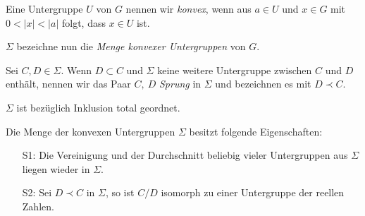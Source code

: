 \begin{defn}\label{konvexUGR} %
Eine Untergruppe $U$ von $G$ nennen wir \textit{konvex}, wenn aus $a \in U$ und $x \in G$ mit $0 < |x| < |a|$ folgt, dass $x \in U$ ist.\\
\end{defn}
$\Sigma$ bezeichne nun die \textit{Menge konvexer Untergruppen} von $G$. 
\begin{defn}\label{Sprung} %
Sei $C, D \in \Sigma$. Wenn $D \subset C$ und $\Sigma$ keine weitere Untergruppe zwischen $C$ und $D$ enthält, nennen wir das Paar $C,~D$ \textit{Sprung} in $\Sigma$ und bezeichnen es mit $D \prec C$.
\end{defn}
%
% 
%
%
%
%
\begin{lemma}\label{untergruppeangeordnet}
$\Sigma$ ist bezüglich Inklusion total geordnet.
\end{lemma}
%
\begin{satz}\label{EigenschaftenKonvexeUgr}
Die Menge der konvexen Untergruppen $\Sigma$ besitzt folgende Eigenschaften:
\begin{enumerate}
\item[S1:] Die Vereinigung und der Durchschnitt beliebig vieler Untergruppen aus $\Sigma$ liegen wieder in $\Sigma$.
\item[S2:] Sei $D \prec C$ in $\Sigma$, so ist $C/D$ isomorph zu einer Untergruppe der reellen Zahlen.
\end{enumerate}
\end{satz}
